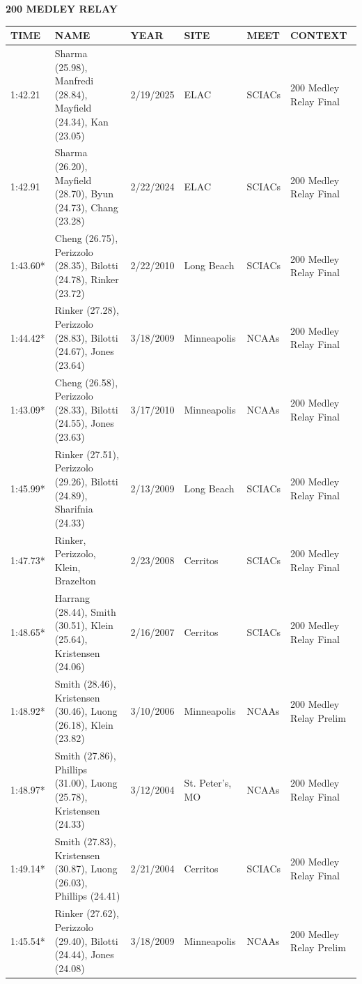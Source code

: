 \begin{table}[H]
\centering
\begin{minipage}[t]{0.6\textwidth}
\centering
\textbf{200 MEDLEY RELAY}\\[0.1cm]
\begin{tabular}{@{}p{1.8cm}p{2.8cm}p{1.2cm}p{1.4cm}p{1.4cm}p{2.0cm}@{}}
\hline
    \textbf{TIME} & \textbf{NAME} & \textbf{YEAR} & \textbf{SITE} & \textbf{MEET} & \textbf{CONTEXT} \\
\hline
    1:42.21 & Sharma (25.98), Manfredi (28.84), Mayfield (24.34), Kan (23.05) & 2/19/2025 & ELAC & SCIACs & 200 Medley Relay Final \\
    1:42.91 & Sharma (26.20), Mayfield (28.70), Byun (24.73), Chang (23.28) & 2/22/2024 & ELAC & SCIACs & 200 Medley Relay Final \\
    1:43.60* & Cheng (26.75), Perizzolo (28.35), Bilotti (24.78), Rinker (23.72) & 2/22/2010 & Long Beach & SCIACs & 200 Medley Relay Final \\
    1:44.42* & Rinker (27.28), Perizzolo (28.83), Bilotti (24.67), Jones (23.64) & 3/18/2009 & Minneapolis & NCAAs & 200 Medley Relay Final \\
    1:43.09* & Cheng (26.58), Perizzolo (28.33), Bilotti (24.55), Jones (23.63) & 3/17/2010 & Minneapolis & NCAAs & 200 Medley Relay Final \\
    1:45.99* & Rinker (27.51), Perizzolo (29.26), Bilotti (24.89), Sharifnia (24.33) & 2/13/2009 & Long Beach & SCIACs & 200 Medley Relay Final \\
    1:47.73* & Rinker, Perizzolo, Klein, Brazelton & 2/23/2008 & Cerritos & SCIACs & 200 Medley Relay Final \\
    1:48.65* & Harrang (28.44), Smith (30.51), Klein (25.64), Kristensen (24.06) & 2/16/2007 & Cerritos & SCIACs & 200 Medley Relay Final \\
    1:48.92* & Smith (28.46), Kristensen (30.46), Luong (26.18), Klein (23.82) & 3/10/2006 & Minneapolis & NCAAs & 200 Medley Relay Prelim \\
    1:48.97* & Smith (27.86), Phillips (31.00), Luong (25.78), Kristensen (24.33) & 3/12/2004 & St. Peter's, MO & NCAAs & 200 Medley Relay Final \\
    1:49.14* & Smith (27.83), Kristensen (30.87), Luong (26.03), Phillips (24.41) & 2/21/2004 & Cerritos & SCIACs & 200 Medley Relay Final \\
    1:45.54* & Rinker (27.62), Perizzolo (29.40), Bilotti (24.44), Jones (24.08) & 3/18/2009 & Minneapolis & NCAAs & 200 Medley Relay Prelim \\
\hline
\end{tabular}
\end{minipage}
\end{table}


